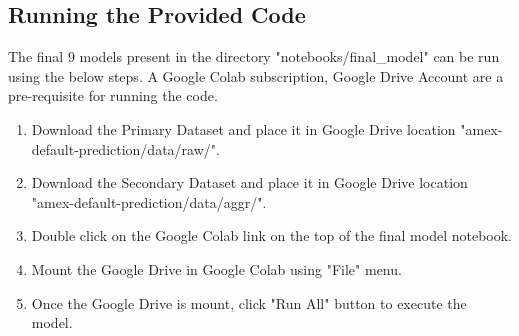 \documentclass[twoside,11pt,a4paper]{article}
\begin{document}
\subsection{Running the Provided Code}
The final 9 models present in the directory "notebooks/final\_model" can be run using the below steps. A Google Colab subscription, Google Drive Account are a pre-requisite for running the code.
\begin{enumerate}
	\item Download the Primary Dataset and place it in Google Drive location "amex-default-prediction/data/raw/".
	\item Download the Secondary Dataset and place it in Google Drive location "amex-default-prediction/data/aggr/".
	\item Double click on the Google Colab link on the top of the final model notebook.
	\item Mount the Google Drive in Google Colab using "File" menu.
	\item Once the Google Drive is mount, click "Run All" button to execute the model.
\end{enumerate}



\clearpage
\end{document}
